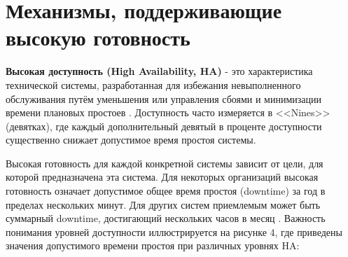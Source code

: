 \section{Механизмы, поддерживающие высокую готовность}

\begin{grayquote}
    \textbf{Высокая доступность (High Availability, HA)} - это характеристика технической системы, разработанная для избежания невыполненного обслуживания путём уменьшения или управления сбоями и минимизации времени плановых простоев \autocite{WikiHA}. Доступность часто измеряется в <<Nines>> (девятках), где каждый дополнительный девятый в проценте доступности существенно снижает допустимое время простоя системы.
\end{grayquote}

Высокая готовность для каждой конкретной системы зависит от цели, для которой предназначена эта система. Для некоторых организаций высокая готовность означает допустимое общее время простоя (downtime) за год в пределах нескольких минут. Для других систем приемлемым может быть суммарный downtime, достигающий нескольких часов в месяц \autocite{OszuValduriez}.
Важность понимания уровней доступности иллюстрируется на рисунке 4, где приведены значения допустимого времени простоя при различных уровнях HA:


